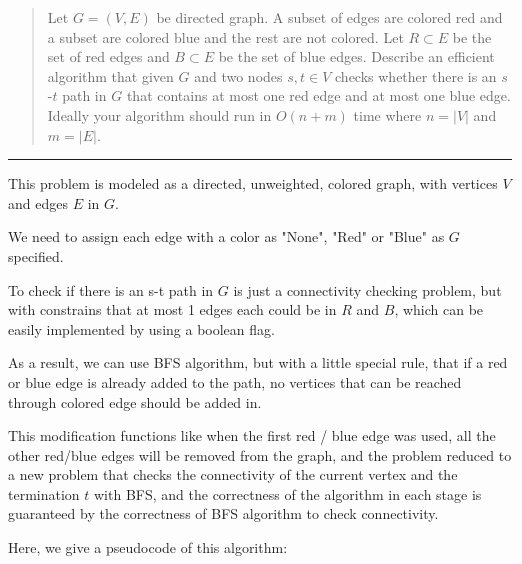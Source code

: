 \documentclass[11pt]{article}
\begin{document}



\begin{quote}
	Let $G=(V,E)$ be directed graph. A subset of edges are colored
  red and a subset are colored blue and the rest are not colored.  Let
  $R \subset E$ be the set of red edges and $B \subset E$ be the set
  of blue edges.  Describe an efficient algorithm that given $G$ and
  two nodes $s,t \in V$ checks whether there is an $s$-$t$ path in $G$
  that contains at most one red edge and at most one blue edge. Ideally
  your algorithm should run in $O(n+m)$ time where $n = |V|$ and $m = |E|$.
\end{quote}
\hrule

\begin{solution}
	This problem is modeled as a directed, unweighted, colored graph, with vertices $V$ and edges $E$ in $G$. 
	
	We need to assign each edge with a color as "None", "Red" or "Blue" as $G$ specified.
	
	To check if there is an s-t path in $G$ is just a connectivity checking problem, but with constrains that at most 1 edges each could be in $R$ and $B$, which can be easily implemented by using a boolean flag.
	
	As a result, we can use BFS algorithm, but with a little special rule, that if a red or blue edge is already added to the path, no vertices that can be reached through colored edge should be added in.
	
	This modification functions like when the first red / blue edge was used, all the other red/blue edges will be removed from the graph, and the problem reduced to a new problem that checks the connectivity of the current vertex and the termination $t$ with BFS, and the correctness of the algorithm in each stage is guaranteed by the correctness of BFS algorithm to check connectivity.
	
	Here, we give a pseudocode of this algorithm:
	

\end{solution}
\end{document}
